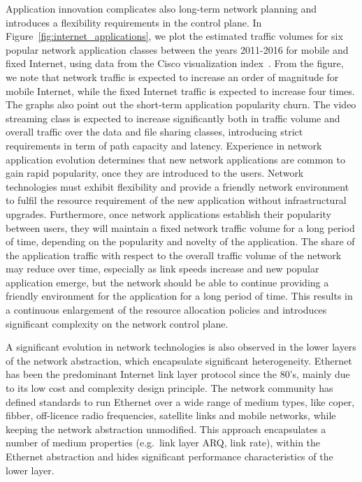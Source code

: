 Application innovation complicates also long-term network planning and
introduces a flexibility requirements in the control plane.  In
Figure~\ref{fig:internet_applications}, we plot the estimated traffic volumes
for six popular network application classes between the years 2011-2016 for
mobile and fixed Internet, using data from the Cisco visualization
index~\cite{Mobile:2012vd,Cisco:2012wu}. From the figure, we note that network
traffic is expected to increase an order of magnitude for mobile Internet, while
the fixed Internet traffic is expected to increase four times. The graphs also
point out the short-term application popularity churn.  The video streaming
class is expected to increase significantly both in traffic volume and overall
traffic over the data and file sharing classes, introducing strict requirements
in term of path capacity and latency.  Experience in network application
evolution determines that new network applications are common to gain rapid
popularity, once they are introduced to the users.  Network technologies must
exhibit flexibility and provide a friendly network environment to fulfil the
resource requirement of the new application without infrastructural upgrades.
Furthermore, once network applications establish their popularity between users,
they will maintain a fixed network traffic volume for a long period of time,
depending on the popularity and novelty of the application. The share of the
application traffic with respect to the overall traffic volume of the network
may reduce over time, especially as link speeds increase and new popular
application emerge, but the network should be able to continue providing a
friendly environment for the application for a long period of time.  This
results in a continuous enlargement of the resource allocation policies and
introduces significant complexity on the network control plane.

A significant evolution in network technologies is also observed in the lower
layers of the network abstraction, which encapsulate significant heterogeneity.
Ethernet has been the predominant Internet link layer protocol since the 80's,
mainly due to its low cost and complexity design principle. The network
community has defined standards to run Ethernet over a wide range of medium
types, like coper, fibber, off-licence radio frequencies, satellite links and
mobile networks, while keeping the network abstraction unmodified. This approach
encapsulates a number of medium properties (e.g.~link layer ARQ, link rate),
within the Ethernet abstraction and hides significant performance
characteristics of the lower layer.

